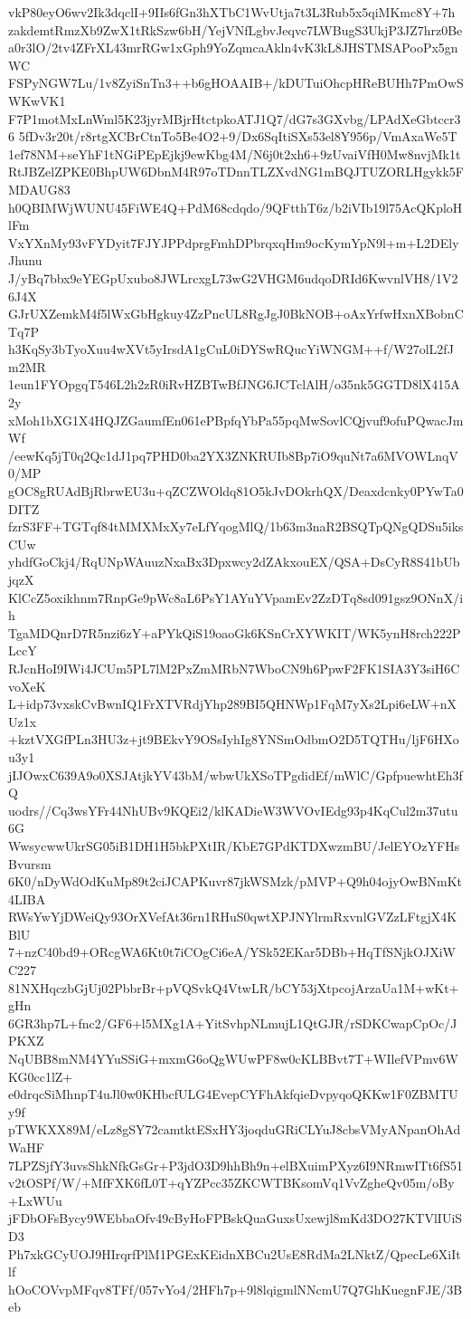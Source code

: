 vkP80eyO6wv2Ik3dqclI+9IIs6fGn3hXTbC1WvUtja7t3L3Rub5x5qiMKmc8Y+7h
zakdemtRmzXb9ZwX1tRkSzw6bH/YejVNfLgbvJeqvc7LWBugS3UkjP3JZ7hrz0Be
a0r3lO/2tv4ZFrXL43mrRGw1xGph9YoZqmcaAkln4vK3kL8JHSTMSAPooPx5gnWC
FSPyNGW7Lu/1v8ZyiSnTn3++b6gHOAAIB+/kDUTuiOhcpHReBUHh7PmOwSWKwVK1
F7P1motMxLnWml5K23jyrMBjrHtctpkoATJ1Q7/dG7s3GXvbg/LPAdXeGbtccr36
5fDv3r20t/r8rtgXCBrCtnTo5Be4O2+9/Dx6SqItiSXs53el8Y956p/VmAxaWe5T
1ef78NM+seYhF1tNGiPEpEjkj9ewKbg4M/N6j0t2xh6+9zUvaiVfH0Mw8nvjMk1t
RtJBZelZPKE0BhpUW6DbnM4R97oTDnnTLZXvdNG1mBQJTUZORLHgykk5FMDAUG83
h0QBIMWjWUNU45FiWE4Q+PdM68cdqdo/9QFtthT6z/b2iVIb19l75AcQKploHlFm
VxYXnMy93vFYDyit7FJYJPPdprgFmhDPbrqxqHm9ocKymYpN9l+m+L2DElyJhunu
J/yBq7bbx9eYEGpUxubo8JWLrcxgL73wG2VHGM6udqoDRId6KwvnlVH8/1V26J4X
GJrUXZemkM4f5lWxGbHgkuy4ZzPncUL8RgJgJ0BkNOB+oAxYrfwHxnXBobnCTq7P
h3KqSy3bTyoXuu4wXVt5yIrsdA1gCuL0iDYSwRQucYiWNGM++f/W27olL2fJm2MR
1eun1FYOpgqT546L2h2zR0iRvHZBTwBfJNG6JCTclAlH/o35nk5GGTD8lX415A2y
xMoh1bXG1X4HQJZGaumfEn061ePBpfqYbPa55pqMwSovlCQjvuf9ofuPQwacJmWf
/eewKq5jT0q2Qc1dJ1pq7PHD0ba2YX3ZNKRUIb8Bp7iO9quNt7a6MVOWLnqV0/MP
gOC8gRUAdBjRbrwEU3u+qZCZWOldq81O5kJvDOkrhQX/Deaxdcnky0PYwTa0DITZ
fzrS3FF+TGTqf84tMMXMxXy7eLfYqogMlQ/1b63m3naR2BSQTpQNgQDSu5iksCUw
yhdfGoCkj4/RqUNpWAuuzNxaBx3Dpxwcy2dZAkxouEX/QSA+DsCyR8S41bUbjqzX
KlCcZ5oxikhnm7RnpGe9pWc8aL6PsY1AYuYVpamEv2ZzDTq8sd091gsz9ONnX/ih
TgaMDQnrD7R5nzi6zY+aPYkQiS19oaoGk6KSnCrXYWKIT/WK5ynH8rch222PLccY
RJcnHoI9IWi4JCUm5PL7lM2PxZmMRbN7WboCN9h6PpwF2FK1SIA3Y3siH6CvoXeK
L+idp73vxskCvBwnIQ1FrXTVRdjYhp289BI5QHNWp1FqM7yXs2Lpi6eLW+nXUz1x
+kztVXGfPLn3HU3z+jt9BEkvY9OSsIyhIg8YNSmOdbmO2D5TQTHu/ljF6HXou3y1
jIJOwxC639A9o0XSJAtjkYV43bM/wbwUkXSoTPgdidEf/mWlC/GpfpuewhtEh3fQ
uodrs//Cq3wsYFr44NhUBv9KQEi2/klKADieW3WVOvIEdg93p4KqCul2m37utu6G
WwsycwwUkrSG05iB1DH1H5bkPXtIR/KbE7GPdKTDXwzmBU/JelEYOzYFHsBvursm
6K0/nDyWdOdKuMp89t2ciJCAPKuvr87jkWSMzk/pMVP+Q9h04ojyOwBNmKt4LIBA
RWsYwYjDWeiQy93OrXVefAt36rn1RHuS0qwtXPJNYlrmRxvnlGVZzLFtgjX4KBlU
7+nzC40bd9+ORcgWA6Kt0t7iCOgCi6eA/YSk52EKar5DBb+HqTfSNjkOJXiWC227
81NXHqczbGjUj02PbbrBr+pVQSvkQ4VtwLR/bCY53jXtpcojArzaUa1M+wKt+gHn
6GR3hp7L+fnc2/GF6+l5MXg1A+YitSvhpNLmujL1QtGJR/rSDKCwapCpOc/JPKXZ
NqUBB8mNM4YYuSSiG+mxmG6oQgWUwPF8w0cKLBBvt7T+WIlefVPmv6WKG0cc1lZ+
e0drqcSiMhnpT4uJl0w0KHbcfULG4EvepCYFhAkfqieDvpyqoQKKw1F0ZBMTUy9f
pTWKXX89M/eLz8gSY72camtktESxHY3joqduGRiCLYuJ8cbsVMyANpanOhAdWaHF
7LPZSjfY3uvsShkNfkGsGr+P3jdO3D9hhBh9n+elBXuimPXyz6I9NRmwITt6fS51
v2tOSPf/W/+MfFXK6fL0T+qYZPcc35ZKCWTBKsomVq1VvZgheQv05m/oBy+LxWUu
jFDbOFsBycy9WEbbaOfv49cByHoFPBskQuaGuxsUxewjl8mKd3DO27KTVlIUiSD3
Ph7xkGCyUOJ9HIrqrfPlM1PGExKEidnXBCu2UsE8RdMa2LNktZ/QpecLe6XiItlf
hOoCOVvpMFqv8TFf/057vYo4/2HFh7p+9l8lqigmlNNcmU7Q7GhKuegnFJE/3Beb
